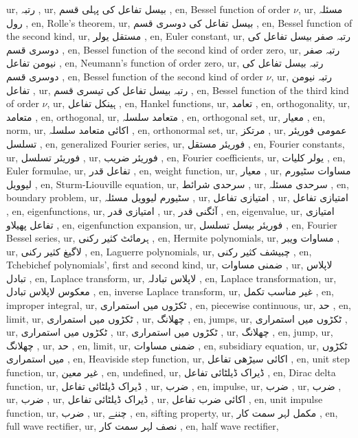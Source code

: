 ur, رتبہ ,
ur, بیسل تفاعل کی پہلی قسم ,
en, Bessel function of order $\nu $,
ur, مسئلہ رول ,
en, Rolle's theorem,
ur, بیسل تفاعل کی دوسری قسم ,
en, Bessel function of the second kind,
ur, مستقل یولر ,
en, Euler constant,
ur, رتبہ صفر بیسل تفاعل کی دوسری قسم ,
en, Bessel function of the second kind of order zero,
ur, رتبہ صفر نیومن تفاعل ,
en, Neumann's function of order zero,
ur, رتبہ  بیسل تفاعل کی دوسری قسم ,
en, Bessel function of the second kind of order $\nu $,
ur, رتبہ  نیومن تفاعل ,
ur, رتبہ  بیسل تفاعل کی تیسری قسم ,
en, Bessel function of the third kind of order $\nu $,
ur, ہینکل تفاعل ,
en, Hankel functions,
ur, تعامد ,
en, orthogonality,
ur, متعامد ,
en, orthogonal,
ur, متعامد سلسلہ ,
en, orthogonal set,
ur, معیار ,
en, norm,
ur, اکائی متعامد سلسلہ ,
en, orthonormal set,
ur, مرتکز ,
ur, عمومی فوریئر تسلسل ,
en, generalized Fourier series,
ur, فوریئر مستقل ,
en, Fourier constants,
ur, فوریئر تسلسل ,
ur, فوریئر ضریب  ,
en, Fourier coefficients,
ur, یولر کلیات ,
en, Euler formulae,
ur, تفاعل قدر ,
en, weight function,
ur, معیار ,
ur, مساوات سٹیورم لیوویل ,
en, Sturm-Liouville equation,
ur, سرحدی شرائط ,
ur, سرحدی مسئلہ ,
en, boundary problem,
ur, سٹیورم لیوویل مسئلہ ,
ur, امتیازی تفاعل ,
ur, امتیازی تفاعل ,
en, eigenfunctions,
ur, امتیازی قدر ,
ur, آئگنی قدر ,
en, eigenvalue,
ur, امتیازی تفاعل پھیلاو ,
en, eigenfunction expansion,
ur, فوریئر بیسل تسلسل ,
en, Fourier Bessel series,
ur, ہرمائٹ کثیر رکنی ,
en, Hermite polynomials,
ur, مساوات ویبر ,
ur, لاگیغ کثیر رکنی ,
en, Laguerre polynomials,
ur, چبیشف کثیر رکنی ,
en, Tchebichef polynomials', first and second kind,
ur, ضمنی مساوات ,
ur, لاپلاس تبادل ,
en, ٔLaplace transform,
ur, لاپلاس تبادلہ ,
en, Laplace transformation,
ur, معکوس لاپلاس تبادل ,
en, inverse Laplace transform,
ur, غیر مناسب تکمل ,
en, improper integral,
ur, ٹکڑوں میں استمراری ,
en, piecewise continuous,
ur, حد ,
en, limit,
ur, ٹکڑوں میں استمراری ,
ur, چھلانگ ,
en, jumps,
ur, ٹکڑوں میں استمراری ,
ur, ٹکڑوں میں استمراری ,
ur, ٹکڑوں میں استمراری ,
ur, چھلانگ ,
en, jump,
ur, چھلانگ ,
ur, حد ,
en, limit,
ur, ضمنی مساوات ,
en, subsidiary equation,
ur, ٹکڑوں میں استمراری ,
en, Heaviside step function,
ur, اکائی سیڑھی تفاعل ,
en, unit step function,
ur, غیر معین ,
en, undefined,
ur, ڈیراک ڈیلٹائی تفاعل ,
en, Dirac delta function,
ur, ڈیراک ڈیلٹائی تفاعل ,
ur, ضرب ,
en, impulse,
ur, ضرب ,
ur, ضرب ,
ur, ضرب ,
ur, ڈیراک ڈیلٹائی تفاعل ,
ur, اکائی ضرب تفاعل ,
en, unit impulse function,
ur, ضرب ,
ur, چننے ,
en, sifting property,
ur, مکمل لہر سمت کار ,
en, full wave rectifier,
ur, نصف لہر سمت کار ,
en, half wave rectifier,
